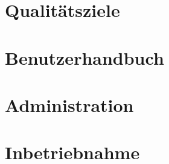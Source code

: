 \documentclass[a4paper,11pt,listof=numbered,glossary=totoc,parskip=half,toc=bib]{scrreprt}
\begin{document}
\begin{appendices}
		
			
		
		
		
	
	\chapter{Qualitätsziele}
	\chapter{Benutzerhandbuch}
	\chapter{Administration}
	\chapter{Inbetriebnahme}
	
	\end{appendices}
	\newpage	
	\setcounter{chapter}{\thelastRomanCounter} %
\renewcommand \thechapter{\Roman{chapter}}	\printbibliography[heading=bibnumbered,title=Literaturverzeichnis]
\end{document}
